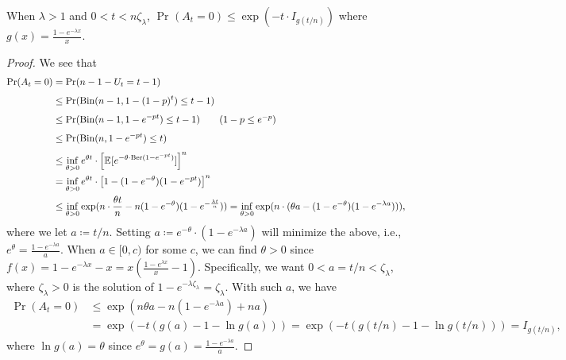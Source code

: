 \begin{lemma}\label{lma:supercritical-Erdős-Rényi-graph}
	When \(\lambda > 1\) and \(0 < t < n \zeta _{\lambda }\), \(\Pr_{}(A_t = 0) \leq \exp (-t \cdot I_{g(t / n)})\) where \(g(x) = \frac{1 - e^{-\lambda x}}{x}\).
\end{lemma}
\begin{proof}
	We see that
	\begin{align*}
		\Pr_{}(A_t = 0)
		 & = \Pr_{}(n-1 - U_t = t-1)                                                                                                        \\
		 & \leq \Pr_{}(\operatorname{Bin}(n-1, 1 - (1 - p)^t) \leq t-1)                                                                     \\
		 & \leq \Pr_{}(\operatorname{Bin}(n-1, 1 - e^{-p t}) \leq t-1) \tag*{(\(1 - p \leq e^{-p}\))}                                       \\
		 & \leq \Pr_{}(\operatorname{Bin}(n, 1 - e^{-p t}) \leq t)                                                                          \\
		 & \leq \inf _{\theta  > 0} e^{\theta t} \cdot \left[ \mathbb{E}_{}[e^{-\theta \cdot \operatorname{Ber}(1 - e^{-p t}) }] \right] ^n \\
		 & = \inf _{\theta > 0} e^{\theta t} \cdot \left[ 1 - (1 - e^{-\theta } ) (1 - e^{-p t} )\right] ^n                                 \\
		 & \leq \inf _{\theta > 0} \exp (n \cdot \frac{\theta t}{n} - n (1 - e^{-\theta }) (1 - e^{- \frac{\lambda t}{n}}))
		= \inf _{\theta > 0} \exp (n \cdot (\theta a - (1 - e^{-\theta }) (1 - e^{-\lambda a}))),
	\end{align*}
	where we let \(a \coloneqq t / n\). Setting \(a \coloneqq e^{-\theta } \cdot (1 - e^{-\lambda a})\) will minimize the above, i.e., \(e^{\theta } = \frac{1 - e^{-\lambda a}}{a}\). When \(a \in [0, c)\) for some \(c\), we can find \(\theta > 0\) since \(f(x) = 1 - e^{-\lambda x} - x = x (\frac{1-e^{\lambda x}}{x} - 1)\). Specifically, we want \(0 < a = t / n < \zeta _\lambda \), where \(\zeta _\lambda > 0\) is the solution of \(1 - e^{-\lambda \zeta _\lambda } = \zeta _\lambda \). With such \(a\), we have
	\[
		\begin{split}
			\Pr_{}(A_t = 0)
			 & \leq \exp (n \theta a -  n(1 - e^{-\lambda a}) + na) \\
			 & = \exp (-t (g(a) - 1 - \ln g(a)))
			= \exp (-t (g(t / n) - 1 - \ln g(t / n)))
			= I_{g(t / n)},
		\end{split}
	\]
	where \(\ln g(a) = \theta \) since \(e^\theta = g(a) = \frac{1 - e^{-\lambda a}}{a}\).
\end{proof}

